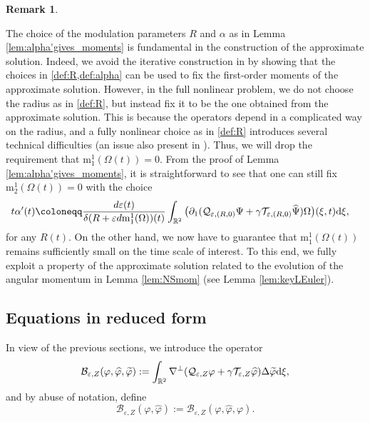 \documentclass[11pt,reqno,a4paper]{amsart}
\def\dd{{\rm d}}
\def\eps{\varepsilon}
\def\de{{\partial}}
\def\RR {\mathbb{R}}
\def\R {\mathbb{R}} %
\newcommand{\cB}{\mathcal{B}}
\newcommand{\cQ}{\mathcal{Q}}
\newcommand{\cT}{\mathcal{T}}
\newcommand{\mrm}{\mathrm{m}}
\newcommand{\1}{\mathbbm{1}}
\theoremstyle{definition}
\newtheorem{remark}[proposition]{Remark}
\theoremstyle{definition}
\numberwithin{equation}{section}
\begin{document}
\begin{remark}
\label{rem:commentRalpha}

The choice of the modulation parameters $R$ and $\alpha$ as in Lemma \ref{lem:alpha'gives_moments} is fundamental in the construction of the approximate solution. Indeed, we avoid the iterative construction in \cite{dolce2024long,zhang2025long} by showing that the choices in \cref{def:R,def:alpha} can be used to fix the first-order moments of the approximate solution. However, in the full nonlinear problem, we do not choose the radius as in \cref{def:R}, but instead fix it to be the one obtained from the approximate solution. This is because the operators depend in a complicated way on the radius, and a fully nonlinear choice as in \cref{def:R} introduces several technical difficulties (an issue also present in \cite{zhang2025long}). Thus, we will drop the requirement that $\mrm^1_1(\Omega(t))=0$. From the proof of Lemma \ref{lem:alpha'gives_moments}, it is straightforward to see that one can still fix $\mrm_2^1(\Omega(t))=0$ with the choice
    \begin{align}
    t\alpha'(t)&\coloneqq\frac{d\eps(t)}{\delta (R+\eps d \mrm^1_1(\Omega))(t)}\int_{\RR^2}\big(\de_1(\cQ_{\eps,(R,0)}\Psi+\gamma \cT_{\eps,(R,0)}\widehat{\Psi})\Omega\big)(\xi,t)\dd \xi,
    \end{align}
    for any $R(t)$. On the other hand, we now have to guarantee that $\mrm^1_1(\Omega(t))$ remains sufficiently small on the time scale of interest. To this end, we fully exploit a property of the approximate solution related to the evolution of the angular momentum in Lemma \ref{lem:NSmom} (see Lemma \ref{lem:keyLEuler}).
    \end{remark}
\subsection{Equations in reduced form}
In view of the previous sections, we introduce the operator
\begin{equation}\label{def:cA}
    \cB_{\eps,Z}(\varphi,\widehat{\varphi},\widetilde{\varphi}) := \int_{\R^2} \nabla^\perp(\cQ_{\eps,Z}\varphi+\gamma\cT_{\eps,Z}\widehat{\varphi})\Delta\widetilde{\varphi} \dd \xi,
\end{equation}
and by abuse of notation, define
\begin{equation}
 \cB_{\eps,Z}(\varphi,\widehat{\varphi}) := \mathcal{B}_{\eps,Z}(\varphi,\widehat{\varphi},\varphi).
\end{equation}
\end{document}
